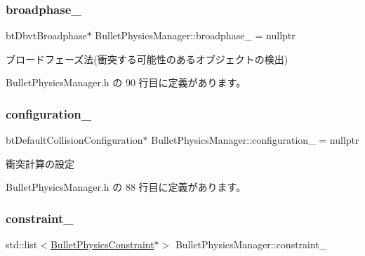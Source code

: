 \subsubsection{\texorpdfstring{broadphase\+\_\+}{broadphase\_}}
{\footnotesize\ttfamily bt\+Dbvt\+Broadphase$\ast$ Bullet\+Physics\+Manager\+::broadphase\+\_\+ = nullptr\hspace{0.3cm}{\ttfamily [private]}}



ブロードフェーズ法(衝突する可能性のあるオブジェクトの検出) 



 Bullet\+Physics\+Manager.\+h の 90 行目に定義があります。

\mbox{\label{class_bullet_physics_manager_afb7550b9dfffd2731572aada4f0af008}} 
\subsubsection{\texorpdfstring{configuration\+\_\+}{configuration\_}}
{\footnotesize\ttfamily bt\+Default\+Collision\+Configuration$\ast$ Bullet\+Physics\+Manager\+::configuration\+\_\+ = nullptr\hspace{0.3cm}{\ttfamily [private]}}



衝突計算の設定 



 Bullet\+Physics\+Manager.\+h の 88 行目に定義があります。

\mbox{\label{class_bullet_physics_manager_a216431f03ee96997473e19b6dbbef01c}} 
\subsubsection{\texorpdfstring{constraint\+\_\+}{constraint\_}}
{\footnotesize\ttfamily std\+::list$<$\mbox{\hyperlink{class_bullet_physics_constraint}{Bullet\+Physics\+Constraint}}$\ast$$>$ Bullet\+Physics\+Manager\+::constraint\+\_\+\hspace{0.3cm}{\ttfamily [private]}}




